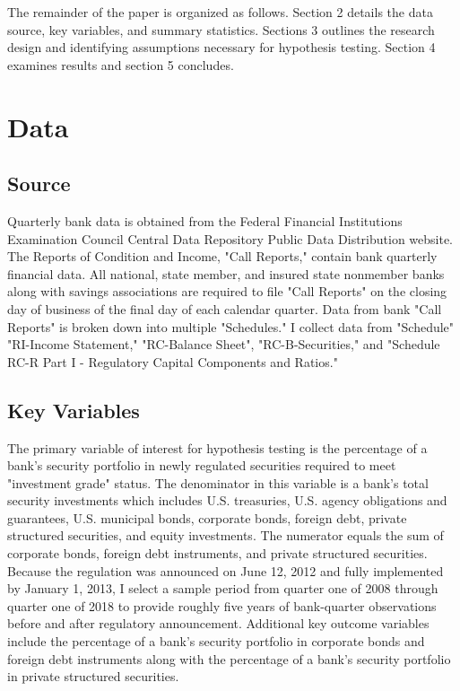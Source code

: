 \documentclass[preprint,12pt]{elsarticle}
\begin{document}
The remainder of the paper is organized as follows. Section 2 details the data source, key variables, and summary statistics.  Sections 3 outlines the research design and identifying assumptions necessary for hypothesis testing.  Section 4 examines results and section 5 concludes. 

\section{Data}
\subsection{Source}
Quarterly bank data is obtained from the Federal Financial Institutions Examination Council Central Data Repository Public Data Distribution website.  The Reports of Condition and Income, "Call Reports," contain bank quarterly financial data.  All national, state member, and insured state nonmember banks along with savings associations are required to file "Call Reports" on the closing day of business of the final day of each calendar quarter.  Data from bank "Call Reports" is broken down into multiple "Schedules."  I collect data from "Schedule" "RI-Income Statement," "RC-Balance Sheet", "RC-B-Securities," and "Schedule RC-R Part I - Regulatory Capital Components and Ratios." 

\subsection{Key Variables}
The primary variable of interest for hypothesis testing is the percentage of a bank's security portfolio in newly regulated securities required to meet "investment grade" status.  The denominator in this variable is a bank's total security investments which includes U.S. treasuries, U.S. agency obligations and guarantees, U.S. municipal bonds, corporate bonds, foreign debt, private structured securities, and equity investments.  The numerator equals the sum of corporate bonds, foreign debt instruments, and private structured securities.  Because the regulation was announced on June 12, 2012 and fully implemented by January 1, 2013, I select a sample period from quarter one of 2008 through quarter one of 2018 to provide roughly five years of bank-quarter observations before and after regulatory announcement.  Additional key outcome variables include the percentage of a bank's security portfolio in corporate bonds and foreign debt instruments along with the percentage of a bank's security portfolio in private structured securities.
\end{document}
